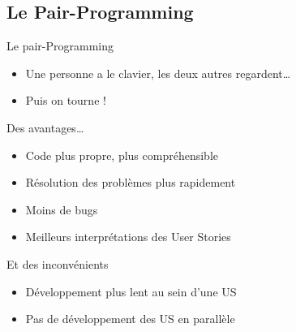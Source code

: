 \FlorentSpeak
\subsection{Le Pair-Programming}
\begin{frame}{Le pair-Programming}
	\begin{itemize}
		\item Une personne a le clavier, les deux autres regardent…
		\item Puis on tourne !
	\end{itemize}
	\vfill
	\pause
	\begin{exampleblock}{Des avantages…}
		\begin{itemize}
			\item Code plus propre, plus compréhensible
			\item Résolution des problèmes plus rapidement
			\item Moins de bugs
			\item Meilleurs interprétations des User Stories 
		\end{itemize}
\end{exampleblock}
	\pause
\vfill
\begin{alertblock}{Et des inconvénients}
\begin{itemize}
	\item Développement plus lent au sein d'une US 
	\item Pas de développement des US en parallèle
\end{itemize}
\end{alertblock}
\end{frame}
	
